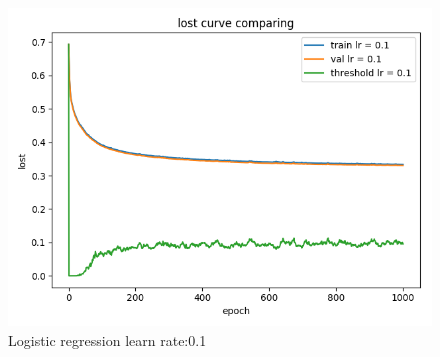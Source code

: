 \documentclass[journal, a4paper]{IEEEtran}
\begin{document}
\begin{figure}[!htb]
	\begin{center}
	\includegraphics[width=\columnwidth]{logr_10}
	\caption{Logistic regression learn rate:0.1}
	\label{fig:logr_10}
	\end{center}
\end{figure}
\end{document}
